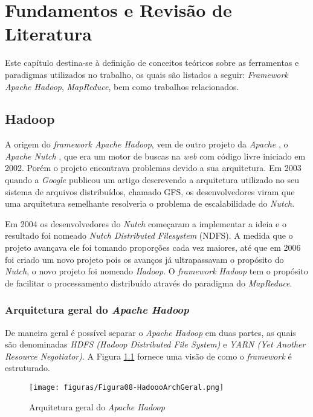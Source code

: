 \chapter{Fundamentos e Revisão de Literatura}

Este capítulo destina-se à definição de conceitos teóricos sobre as ferramentas e paradigmas utilizados no trabalho, os quais são listados a seguir: \emph{Framework Apache Hadoop}, \emph{MapReduce}, bem como trabalhos relacionados.

\section{Hadoop}
A origem do \emph{framework Apache Hadoop}, vem de outro projeto da \emph{Apache} \cite{Apache}, o \emph{Apache Nutch} \cite{Nutch}, que era um motor de buscas na \emph{web} com código livre iniciado em 2002. Porém o projeto encontrava problemas devido a sua arquitetura. Em 2003 quando a \emph{Google} publicou um artigo descrevendo a arquitetura utilizado no seu sistema de arquivos distribuídos, chamado GFS, os desenvolvedores viram que uma arquitetura semelhante resolveria o problema de escalabilidade do \emph{Nutch}.

Em 2004 os desenvolvedores do \emph{Nutch} começaram a implementar a ideia e o resultado foi nomeado \emph{Nutch Distributed Filesystem} (NDFS). A medida que o projeto avançava ele foi tomando proporções cada vez maiores, até que em 2006 foi criado um novo projeto pois os avanços já ultrapassavam o propósito do \emph{Nutch}, o novo projeto foi nomeado \emph{Hadoop}. O \emph{framework Hadoop} tem o propósito de facilitar o processamento distribuído através do paradigma do \emph{MapReduce}.

\subsection{Arquitetura geral do \emph{Apache Hadoop}}
De maneira geral é possível separar o \emph{Apache Hadoop} em duas partes, as quais são denominadas \emph{HDFS (Hadoop Distributed File System)} e \emph{YARN (Yet Another Resource Negotiator)}. A Figura \ref{fig:ArqGeral} fornece uma visão de como o \emph{framework} é estruturado.

\begin{figure}[hbtn]
   \centering
   \texttt{[image: figuras/Figura08-HadoooArchGeral.png]}
   \caption{Arquitetura geral do \emph{Apache Hadoop}}
   \label{fig:ArqGeral}
\end{figure}

